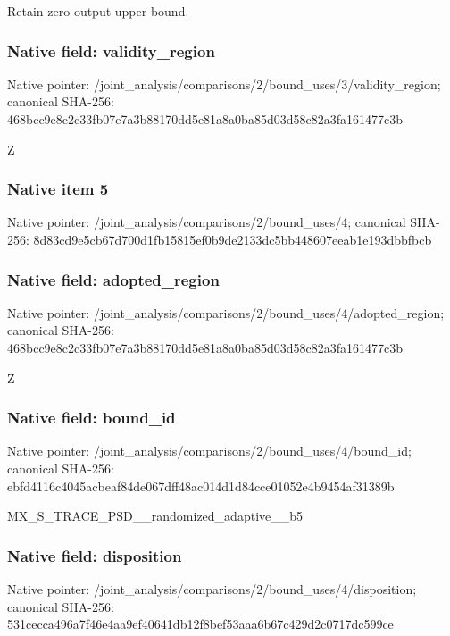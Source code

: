 \documentclass[10pt,a4paper]{article}
\begin{document}
\begingroup\raggedright\sloppy Retain zero-output upper bound.\par\endgroup

\subsubsection{Native field: validity\_\allowbreak{}region}
Native pointer: /joint\_\allowbreak{}analysis/comparisons/2/bound\_\allowbreak{}uses/3/validity\_\allowbreak{}region; canonical SHA-256: 468bcc9e8c2c33fb07e7a3b88170dd5e81a8a0ba85d03d58c82a3fa161477c3b

\begingroup\raggedright\sloppy Z\par\endgroup

\subsubsection{Native item 5}
Native pointer: /joint\_\allowbreak{}analysis/comparisons/2/bound\_\allowbreak{}uses/4; canonical SHA-256: 8d83cd9e5cb67d700d1fb15815ef0b9de2133dc5bb448607eeab1e193dbbfbcb

\subsubsection{Native field: adopted\_\allowbreak{}region}
Native pointer: /joint\_\allowbreak{}analysis/comparisons/2/bound\_\allowbreak{}uses/4/adopted\_\allowbreak{}region; canonical SHA-256: 468bcc9e8c2c33fb07e7a3b88170dd5e81a8a0ba85d03d58c82a3fa161477c3b

\begingroup\raggedright\sloppy Z\par\endgroup

\subsubsection{Native field: bound\_\allowbreak{}id}
Native pointer: /joint\_\allowbreak{}analysis/comparisons/2/bound\_\allowbreak{}uses/4/bound\_\allowbreak{}id; canonical SHA-256: ebfd4116c4045acbeaf84de067dff48ac014d1d84cce01052e4b9454af31389b

\begingroup\raggedright\sloppy MX\_\allowbreak{}S\_\allowbreak{}TRACE\_\allowbreak{}PSD\_\allowbreak{}\_\allowbreak{}randomized\_\allowbreak{}adaptive\_\allowbreak{}\_\allowbreak{}b5\par\endgroup

\subsubsection{Native field: disposition}
Native pointer: /joint\_\allowbreak{}analysis/comparisons/2/bound\_\allowbreak{}uses/4/disposition; canonical SHA-256: 531cecca496a7f46e4aa9ef40641db12f8bef53aaa6b67c429d2c0717dc599ce
\end{document}

